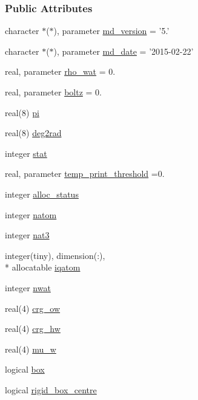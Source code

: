 \subsubsection*{Public Attributes}
\begin{DoxyCompactItemize}
\item 
character $\ast$($\ast$), parameter \hyperlink{classmd_abb490d4badb544874ee4342f02ba7fa8}{md\-\_\-version} = '5.'
\item 
character $\ast$($\ast$), parameter \hyperlink{classmd_a6c2c232df9edb1644753158383775aa5}{md\-\_\-date} = '2015-\/02-\/22'
\item 
real, parameter \hyperlink{classmd_a140121ec92e7b43f4414f496ad1eccda}{rho\-\_\-wat} = 0.
\item 
real, parameter \hyperlink{classmd_ae6fcbf197badd98da838c88da3c0ba6e}{boltz} = 0.
\item 
real(8) \hyperlink{classmd_a1e7c5d22c5511259671696e33773e711}{pi}
\item 
real(8) \hyperlink{classmd_a74717183b234e02c3c62e961cbd09460}{deg2rad}
\item 
integer \hyperlink{classmd_a6e1f91a2c93479a46931a0792edd2992}{stat}
\item 
real, parameter \hyperlink{classmd_a43d2692536b8153c4d909890ae0810c6}{temp\-\_\-print\-\_\-threshold} =0.
\item 
integer \hyperlink{classmd_a358829136657cccc90902c5d5185f59d}{alloc\-\_\-status}
\item 
integer \hyperlink{classmd_a21f10b21c3a176c7844e777597140eaa}{natom}
\item 
integer \hyperlink{classmd_a722363b10ec879b742c6798339f2cf8f}{nat3}
\item 
integer(tiny), dimension(\-:), \\*
allocatable \hyperlink{classmd_a434a8459f8a20994083317bf0d889b0f}{iqatom}
\item 
integer \hyperlink{classmd_a9cd59ec25aea40b601f42e0e80b23944}{nwat}
\item 
real(4) \hyperlink{classmd_ad5eaf701ffc88248bd1659cd9cbda43c}{crg\-\_\-ow}
\item 
real(4) \hyperlink{classmd_a6d712cef1e054fe1742a7df3438b4610}{crg\-\_\-hw}
\item 
real(4) \hyperlink{classmd_a89b589054b90dada6fb26342927dbeae}{mu\-\_\-w}
\item 
logical \hyperlink{classmd_a7476f44216dc80dd7ddcc80d0a3bcbbd}{box}
\item 
logical \hyperlink{classmd_a195f305fc63ac9582e1dd9ae30587885}{rigid\-\_\-box\-\_\-centre}

\end{DoxyCompactItemize}
